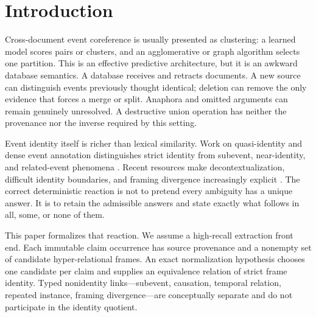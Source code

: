 \documentclass[11pt]{article}
\theoremstyle{definition}
\theoremstyle{remark}
\begin{document}
\section{Introduction}

Cross-document event coreference is usually presented as clustering: a learned
model scores pairs or clusters, and an agglomerative or graph algorithm selects
one partition.  This is an effective predictive architecture, but it is an
awkward database semantics.  A database receives and retracts documents.  A
new source can distinguish events previously thought identical; deletion can
remove the only evidence that forces a merge or split.  Anaphora and omitted
arguments can remain genuinely unresolved.  A destructive union operation has
neither the provenance nor the inverse required by this setting.

Event identity itself is richer than lexical similarity.  Work on
quasi-identity and dense event annotation distinguishes strict identity from
subevent, near-identity, and related-event phenomena
\citep{hovy2013events,asr2014conceptual,pratapa2021dense}.  Recent resources
make decontextualization, difficult identity boundaries, and framing divergence
increasingly explicit \citep{zhao2025beyond,zhao2025framing}.  The correct
deterministic reaction is not to pretend every ambiguity has a unique answer.
It is to retain the admissible answers and state exactly what follows in all,
some, or none of them.

This paper formalizes that reaction.  We assume a high-recall extraction front
end.  Each immutable claim occurrence has source provenance and a nonempty set
of candidate hyper-relational frames.  An exact normalization hypothesis
chooses one candidate per claim and supplies an equivalence relation of strict
frame identity.  Typed nonidentity links---subevent, causation, temporal
relation, repeated instance, framing divergence---are conceptually separate
and do not participate in the identity quotient.
\end{document}
